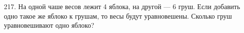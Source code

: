 217. На одной чаше весов лежит 4 яблока, на другой --- 6 груш. Если добавить одно такое же яблоко к грушам, то весы будут уравновешены. Сколько груш уравновешивают одно яблоко?\\
